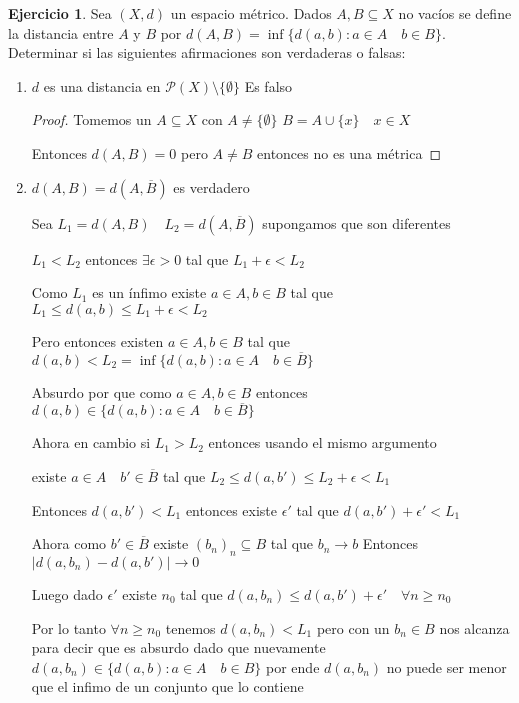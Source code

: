 \documentclass[12pt]{article}
\newcommand{\ra}{\rightarrow}
\newcommand{\ol}{\overline}
\theoremstyle{definition}
\newtheorem{ej}{Ejercicio}
\begin{document}
\begin{ej}
  Sea $(X,d)$ un espacio métrico. Dados $A,B \subseteq X$ no vacíos se define la distancia entre $A$ y $B$ por $d(A,B) = \inf{\{d(a,b): a\in A \quad b \in B\}}$. Determinar si las siguientes afirmaciones son verdaderas o falsas:
  \begin{enumerate}
    \item $d$ es una distancia en $\mathcal{P}(X) \setminus \{\emptyset\}$ Es falso
      \begin{proof}
	Tomemos un $A \subseteq X$ con $A \neq \{\emptyset\}$  $B = A \cup \{x\} \quad x \in X$ 

	Entonces $d(A,B) = 0$ pero $A \neq B$ entonces no es una métrica
	\end{proof}
    \item $d(A,B) = d(A ,\ol  B)$ es verdadero

      Sea $L_1 = d(A,B) \quad L_2 = d( A ,\ol B)$ supongamos que son diferentes

      $L_1 < L_2$ entonces $\exists \epsilon > 0$ tal que $L_1 + \epsilon < L_2$

      Como $L_1$ es un ínfimo existe $a \in A, b \in B$ tal que $L_1 \leq d(a,b) \leq L_1 + \epsilon <  L_2 $

      Pero entonces existen $a \in A , b \in B$ tal que  $d(a,b) <  L_2  = \inf{\{d(a,b): a\in A \quad b \in \ol B\}}$

      Absurdo por que como $a \in A, b\in B$ entonces $d(a,b) \in \{d(a,b): a\in A \quad b \in \ol B\}$

      Ahora en cambio si $L_1 > L_2$ entonces usando el mismo argumento

    existe $a \in A \quad b' \in \ol B$ tal que $L_2 \leq d(a,b') \leq L_2 + \epsilon <  L_1$

    Entonces $d(a,b') < L_1$ entonces existe $\epsilon '$ tal que $d(a,b') + \epsilon ' < L_1$

  Ahora como $b' \in \ol B$ existe $(b_n )_n \subseteq B$ tal que $b_n \ra b$ Entonces $|d(a,b_n) - d(a,b')| \ra 0$ 

  Luego dado $\epsilon '$ existe $n_0$ tal que $d(a,b_n) \leq d(a,b') + \epsilon ' \quad \forall n \geq n_0$

  Por lo tanto $\forall n \geq n_0$ tenemos $d(a,b_n) < L_1$ pero con un $b_n \in B$ nos alcanza para decir que es absurdo dado que nuevamente $d(a,b_n) \in \{d(a,b) : a \in A \quad b \in B\}$ por ende $d(a,b_n)$ no puede ser menor que el infimo de un conjunto que lo contiene


\end{enumerate}
\end{ej}
\end{document}
